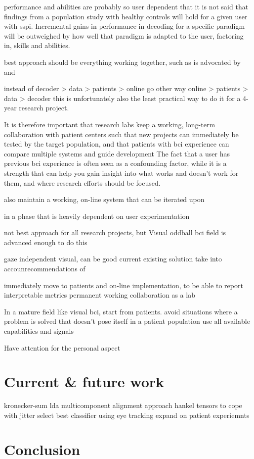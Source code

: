 performance and abilities are probably so user dependent that it is not said that
findings from a population study with healthy controls will hold for a given
user with \ac{sspi}.
Incremental gains in performance in decoding for a specific paradigm will be
outweighed by how well that paradigm is adapted to the user, factoring in,
skills and abilities.

best approach should be everything working together, such as is advocated
by~\textcite{Pan2022} and \textcite{Fouad2020}

instead of decoder > data > patients > online
go other way
online > patients > data > decoder
this is unfortunately also the least practical way to do it for a 4-year
research project.

It is therefore important that research labs keep a working, long-term collaboration with
patient centers such that new projects can immediately be tested by the target
population, and that patients with bci experience can compare multiple systems
and guide development
The fact that a user has previous bci experience is often seen as a confounding
factor, while it is a strength that can help you gain insight into what works
and doesn't work for them, and where research efforts should be focused.

also maintain a working, on-line system that can be iterated upon

in a phase that is heavily dependent on user experimentation

not best approach for all research projects, but
Visual oddball bci field is advanced enough to do this


gaze independent visual, can be good current existing solution
take into accounrecommendations of \textcite{FriedOken2020}

immediately move to patients and on-line implementation, to be able to report
interpretable metrics
permanent working collaboration as a lab

In a mature field like visual bci, start from patients.
avoid situations where a problem is solved that doesn't pose itself in a
patient population
use all available capabilities and signals

Have attention for the personal aspect


\section{Current \& future work}
kronecker-sum lda
multicomponent alignment approach
hankel tensors to cope with jitter
select best classifier using eye tracking
expand on patient experiemnts

\section{Conclusion}
